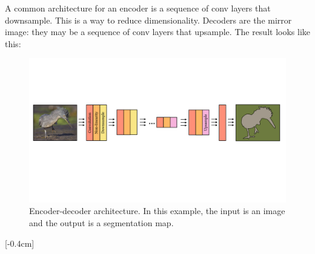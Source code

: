 A common architecture for an encoder is a sequence of conv layers that downsample. This is a way to reduce dimensionality. Decoders are the mirror image: they may be a sequence of conv layers that upsample. The result looks like this:
\begin{figure}[h]
    \centering
    \includegraphics[width=1\linewidth]{./figures/convolutional_neural_nets/encoder_decoder_arch.pdf}
    \caption{Encoder-decoder architecture. In this example, the input is an image and the output is a segmentation map.}
\end{figure}

[-0.4cm]



